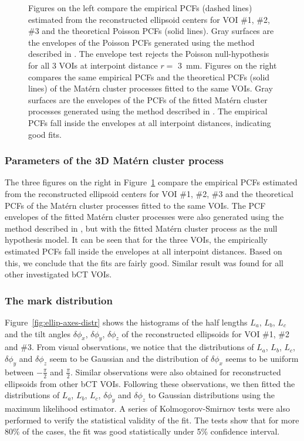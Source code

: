 \documentclass[journal]{IEEEtran}
\begin{document}
\begin{figure}[!htb]
  \caption{Figures on the left compare the empirical PCFs (dashed
    lines) estimated from the reconstructed ellipsoid centers for VOI
    \#1, \#2, \#3 and the theoretical Poisson PCFs (solid lines). Gray
    surfaces are the envelopes of the Poisson PCFs generated using the
    method described in \cite{baddeley2014tests}. The envelope test
    rejects the Poisson null-hypothesis for all 3 VOIs at interpoint
    distance $r = $ \SI{3}{\mm}. Figures on the right compares the
    same empirical PCFs and the theoretical PCFs (solid lines) of the
    Mat\'ern cluster processes fitted to the same VOIs. Gray surfaces
    are the envelopes of the PCFs of the fitted Mat\'ern cluster
    processes generated using the method described in
    \cite{baddeley2014tests}. The empirical PCFs fall inside the
    envelopes at all interpoint distances, indicating good fits.}
  \label{fig:pcf-est}

\end{figure}

\subsubsection{Parameters of the 3D Mat\'ern cluster process}
\label{sec:parameters-3d-matern}

The three figures on the right in Figure~\ref{fig:pcf-est} compare the
empirical PCFs estimated from the reconstructed ellipsoid centers for
VOI \#1, \#2, \#3 and the theoretical PCFs of the Mat\'ern cluster
processes fitted to the same VOIs. The PCF envelopes of the fitted
Mat\'ern cluster processes were also generated using the method
described in \cite{baddeley2014tests}, but with the fitted Mat\'ern
cluster process as the null hypothesis model. It can be seen that for
the three VOIs, the empirically estimated PCFs fall inside the
envelopes at all interpoint distances. Based on this, we conclude that
the fits are fairly good. Similar result was found for all other
investigated bCT VOIs.

\subsubsection{The mark distribution}
\label{sec:mark-distribution-1}

Figure~\ref{fig:ellip-axes-distr} shows the histograms of the half
lengths $L_a$, $L_b$, $L_c$ and the tilt angles $\delta\phi_x$,
$\delta\phi_y$, $\delta\phi_z$ of the reconstructed ellipsoids for VOI
\#1, \#2 and \#3. From visual observations, we notice that the
distributions of $L_a$, $L_b$, $L_c$, $\delta\phi_y$ and
$\delta\phi_z$ seem to be Gaussian and the distribution of
$\delta\phi_x$ seems to be uniform between $-\frac{\pi}{2}$ and
$\frac{\pi}{2}$. Similar observations were also obtained for
reconstructed ellipsoids from other bCT VOIs. Following these
observations, we then fitted the distributions of $L_a$, $L_b$, $L_c$,
$\delta\phi_y$ and $\delta\phi_z$ to Gaussian distributions using the
maximum likelihood estimator. A series of Kolmogorov-Smirnov tests
were also performed to verify the statistical validity of the fit. The
tests show that for more 80\% of the cases, the fit was good
statistically under 5\% confidence interval.
\end{document}
